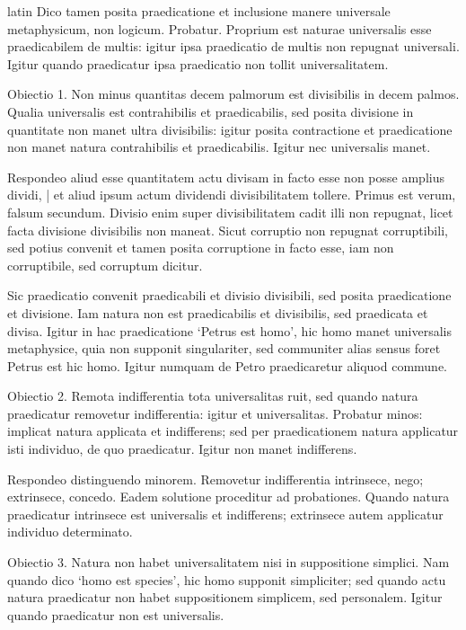 \begin{otherlanguage*}{latin}
\pstart
  Dico tamen posita praedicatione et inclusione manere universale metaphysicum, non logicum. Probatur. Proprium est naturae universalis esse praedicabilem de multis: igitur ipsa praedicatio de multis non repugnat universali. Igitur quando praedicatur ipsa praedicatio non tollit universalitatem. 
\pend

\pstart
  Obiectio 1. Non minus quantitas decem palmorum est divisibilis in decem palmos. Qualia universalis est contrahibilis et praedicabilis, sed posita divisione in quantitate non manet ultra divisibilis: igitur posita contractione et praedicatione non manet natura contrahibilis et praedicabilis. Igitur nec universalis manet. 
\pend

\pstart
  Respondeo aliud esse quantitatem actu divisam in facto esse non posse amplius dividi, \textnormal{|} et aliud ipsum actum dividendi divisibilitatem tollere. Primus est verum, falsum secundum. Divisio enim super divisibilitatem cadit illi non repugnat, licet facta divisione divisibilis non maneat. Sicut corruptio non repugnat corruptibili, sed potius convenit et tamen posita corruptione in facto esse, iam non corruptibile, sed corruptum dicitur. 
\pend

\pstart
  Sic praedicatio convenit praedicabili et divisio divisibili, sed posita praedicatione et divisione. Iam natura non est praedicabilis et divisibilis, sed praedicata et divisa. Igitur in hac praedicatione `Petrus est homo', hic homo manet universalis metaphysice, quia non supponit singulariter, sed communiter alias sensus foret Petrus est hic homo. Igitur numquam de Petro praedicaretur aliquod commune. 
\pend

\pstart
  Obiectio 2. Remota indifferentia tota universalitas ruit, sed quando natura praedicatur removetur indifferentia: igitur et universalitas. Probatur minos: implicat natura applicata et indifferens; sed per praedicationem natura applicatur isti individuo, de quo praedicatur. Igitur non manet indifferens. 
\pend

\pstart
  Respondeo distinguendo minorem. Removetur indifferentia intrinsece, nego; extrinsece, concedo. Eadem solutione proceditur ad probationes. Quando natura praedicatur intrinsece est universalis et indifferens; extrinsece autem applicatur individuo determinato. 
\pend

\pstart
  Obiectio 3. Natura non habet universalitatem nisi in suppositione simplici. Nam quando dico `homo est species', hic homo supponit simpliciter; sed quando actu natura praedicatur non habet suppositionem simplicem, sed personalem. Igitur quando praedicatur non est universalis. 
\pend


\end{otherlanguage*}
